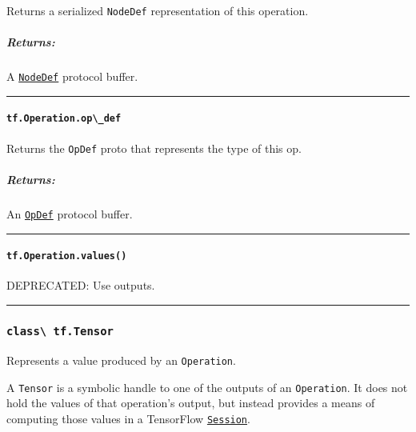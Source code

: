 Returns a serialized \lstinline{NodeDef} representation of this operation.

\subparagraph{Returns: }\label{returns-17}

A
\href{https://tensorflow.googlesource.com/tensorflow/+/master/tensorflow/core/framework/graph.proto}{\lstinline{NodeDef}}
protocol buffer.

\begin{center}\rule{0.5\linewidth}{\linethickness}\end{center}

\paragraph{\texorpdfstring{\lstinline{tf.Operation.op\_def}
}{tf.Operation.op\_def }}\label{tf.operation.opux5fdef}

Returns the \lstinline{OpDef} proto that represents the type of this op.

\subparagraph{Returns: }\label{returns-18}

An
\href{https://tensorflow.googlesource.com/tensorflow/+/master/tensorflow/core/framework/op_def.proto}{\lstinline{OpDef}}
protocol buffer.

\begin{center}\rule{0.5\linewidth}{\linethickness}\end{center}

\paragraph{\texorpdfstring{\lstinline{tf.Operation.values()}
}{tf.Operation.values() }}\label{tf.operation.values}

DEPRECATED: Use outputs.

\begin{center}\rule{0.5\linewidth}{\linethickness}\end{center}

\subsubsection{\texorpdfstring{\lstinline{class\ tf.Tensor}
}{class tf.Tensor }}\label{class-tf.tensor}

Represents a value produced by an \lstinline{Operation}.

A \lstinline{Tensor} is a symbolic handle to one of the outputs of an
\lstinline{Operation}. It does not hold the values of that operation's
output, but instead provides a means of computing those values in a
TensorFlow
\href{../../api_docs/python/client.md\#Session}{\lstinline{Session}}.

